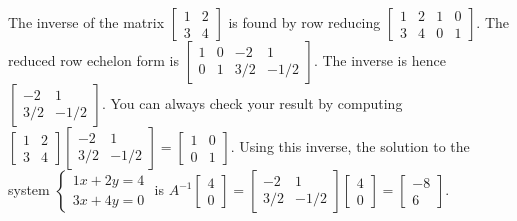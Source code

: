 \documentclass[10pt]{article}
\begin{document}
The inverse of the matrix $\begin{bmatrix} 1&2\\3&4\end{bmatrix}$ is found by row reducing $\begin{bmatrix} 1&2&1&0\\3&4&0&1\end{bmatrix}$.  The reduced row echelon form is  $\begin{bmatrix} 1&0&-2&1\\0&1&3/2&-1/2
\end{bmatrix}$. The inverse is hence $ \begin{bmatrix} -2&1\\3/2&-1/2
\end{bmatrix}$. You can always check your result by computing 
$\begin{bmatrix} 1&2\\ 3&4\end{bmatrix} \begin{bmatrix} -2&1\\3/2&-1/2\end{bmatrix} =  \begin{bmatrix} 1&0\\0&1
\end{bmatrix}$. Using this inverse, the solution to the system $\begin{cases}1x+2y=4\\3x+4y=0\end{cases}$ is $A^{-1}\begin{bmatrix}4\\0\end{bmatrix} = 
\begin{bmatrix} -2&1\\3/2&-1/2\end{bmatrix}
\begin{bmatrix}4\\0\end{bmatrix} =  \begin{bmatrix}-8\\6\end{bmatrix}$.
\end{document}

